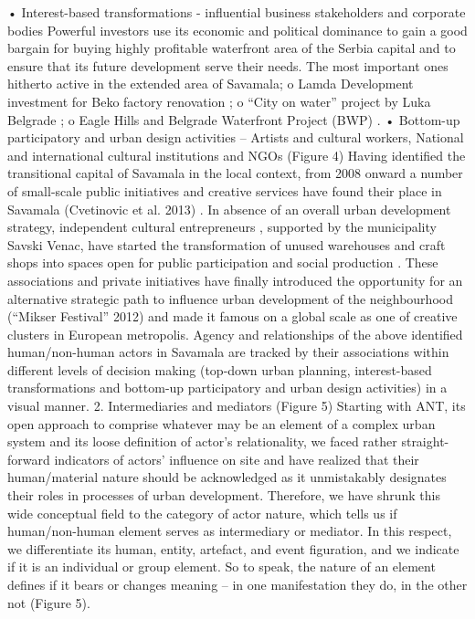 \documentclass[11pt]{report}
\begin{document}
•	Interest-based transformations  - influential business stakeholders and corporate bodies
Powerful investors use its economic and political dominance to gain a good bargain for buying highly profitable waterfront area of the Serbia capital and to ensure that its future development serve their needs. The most important ones hitherto active in the extended area of Savamala;
o	Lamda Development investment for Beko factory renovation ;
o	“City on water” project by Luka Belgrade ;
o	Eagle Hills and Belgrade Waterfront Project (BWP) .
•	Bottom-up participatory and urban design activities – Artists and cultural workers, National and international cultural institutions and NGOs (Figure 4)
Having identified the transitional capital of Savamala in the local context, from 2008 onward a number of small-scale public initiatives and creative services have found their place in Savamala (Cvetinovic et al. 2013) . In absence of an overall urban development strategy, independent cultural entrepreneurs , supported by the municipality Savski Venac, have started the transformation of unused warehouses and craft shops into spaces open for public participation and social production  . These associations and private initiatives have finally introduced the opportunity for an alternative strategic path to influence urban development of the neighbourhood (“Mikser Festival” 2012) and made it famous on a global scale as one of creative clusters in European metropolis.
Agency and relationships of the above identified human/non-human actors in Savamala are tracked by their associations within different levels of decision making (top-down urban planning, interest-based transformations and bottom-up participatory and urban design activities) in a visual manner. 
2.	Intermediaries and mediators (Figure 5)
Starting with ANT, its open approach to comprise whatever may be an element of a complex urban system and its loose definition of actor’s relationality, we faced rather straight-forward indicators of actors’ influence on site and have realized that their human/material nature should be acknowledged as it unmistakably designates their roles in processes of urban development. Therefore, we have shrunk this wide conceptual field to the category of actor nature, which tells us if human/non-human element serves as intermediary or mediator. In this respect, we differentiate its human, entity, artefact, and event figuration, and we indicate if it is an individual or group element. So to speak, the nature of an element defines if it bears or changes meaning – in one manifestation they do, in the other not  (Figure 5).
\end{document}
